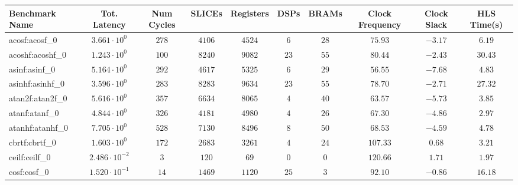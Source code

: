\begin{tabular}{|l|c|c|c|c|c|c|c|c|c|}
\hline
Benchmark Name           & Tot. Latency            & Num Cycles & SLICEs     & Registers  & DSPs    & BRAMs   & Clock Frequency & Clock Slack & HLS Time(s) \\
\hline
acosf:acosf\_0           & $ 3.661 \cdot 10^{0}  $ & $ 278    $ & $ 4106   $ & $ 4524   $ & $ 6   $ & $ 28  $ & $ 75.93       $ & $ -3.17   $ & $ 6.19    $ \\
acoshf:acoshf\_0         & $ 1.243 \cdot 10^{0}  $ & $ 100    $ & $ 8240   $ & $ 9082   $ & $ 23  $ & $ 55  $ & $ 80.44       $ & $ -2.43   $ & $ 30.43   $ \\
asinf:asinf\_0           & $ 5.164 \cdot 10^{0}  $ & $ 292    $ & $ 4617   $ & $ 5325   $ & $ 6   $ & $ 29  $ & $ 56.55       $ & $ -7.68   $ & $ 4.83    $ \\
asinhf:asinhf\_0         & $ 3.596 \cdot 10^{0}  $ & $ 283    $ & $ 8283   $ & $ 9634   $ & $ 23  $ & $ 55  $ & $ 78.70       $ & $ -2.71   $ & $ 27.32   $ \\
atan2f:atan2f\_0         & $ 5.616 \cdot 10^{0}  $ & $ 357    $ & $ 6634   $ & $ 8065   $ & $ 4   $ & $ 40  $ & $ 63.57       $ & $ -5.73   $ & $ 3.85    $ \\
atanf:atanf\_0           & $ 4.844 \cdot 10^{0}  $ & $ 326    $ & $ 4181   $ & $ 4980   $ & $ 4   $ & $ 26  $ & $ 67.30       $ & $ -4.86   $ & $ 2.97    $ \\
atanhf:atanhf\_0         & $ 7.705 \cdot 10^{0}  $ & $ 528    $ & $ 7130   $ & $ 8496   $ & $ 8   $ & $ 50  $ & $ 68.53       $ & $ -4.59   $ & $ 4.78    $ \\
cbrtf:cbrtf\_0           & $ 1.603 \cdot 10^{0}  $ & $ 172    $ & $ 2683   $ & $ 3261   $ & $ 4   $ & $ 24  $ & $ 107.33      $ & $ 0.68    $ & $ 3.21    $ \\
ceilf:ceilf\_0           & $ 2.486 \cdot 10^{-2} $ & $ 3      $ & $ 120    $ & $ 69     $ & $ 0   $ & $ 0   $ & $ 120.66      $ & $ 1.71    $ & $ 1.97    $ \\
cosf:cosf\_0             & $ 1.520 \cdot 10^{-1} $ & $ 14     $ & $ 1469   $ & $ 1120   $ & $ 25  $ & $ 3   $ & $ 92.10       $ & $ -0.86   $ & $ 16.18   $ \\

\end{tabular}
